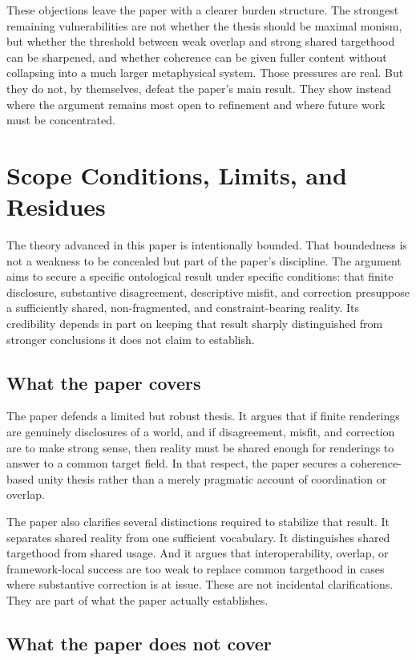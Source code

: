 \documentclass[11pt]{article}
\begin{document}
These objections leave the paper with a clearer burden structure. The strongest remaining vulnerabilities are not whether the thesis should be maximal monism, but whether the threshold between weak overlap and strong shared targethood can be sharpened, and whether coherence can be given fuller content without collapsing into a much larger metaphysical system. Those pressures are real. But they do not, by themselves, defeat the paper's main result. They show instead where the argument remains most open to refinement and where future work must be concentrated.
\section{Scope Conditions, Limits, and Residues}

The theory advanced in this paper is intentionally bounded. That boundedness is not a weakness to be concealed but part of the paper's discipline. The argument aims to secure a specific ontological result under specific conditions: that finite disclosure, substantive disagreement, descriptive misfit, and correction presuppose a sufficiently shared, non-fragmented, and constraint-bearing reality. Its credibility depends in part on keeping that result sharply distinguished from stronger conclusions it does not claim to establish.

\subsection{What the paper covers}

The paper defends a limited but robust thesis. It argues that if finite renderings are genuinely disclosures of a world, and if disagreement, misfit, and correction are to make strong sense, then reality must be shared enough for renderings to answer to a common target field. In that respect, the paper secures a coherence-based unity thesis rather than a merely pragmatic account of coordination or overlap.

The paper also clarifies several distinctions required to stabilize that result. It separates shared reality from one sufficient vocabulary. It distinguishes shared targethood from shared usage. And it argues that interoperability, overlap, or framework-local success are too weak to replace common targethood in cases where substantive correction is at issue. These are not incidental clarifications. They are part of what the paper actually establishes.

\subsection{What the paper does not cover}
\end{document}
